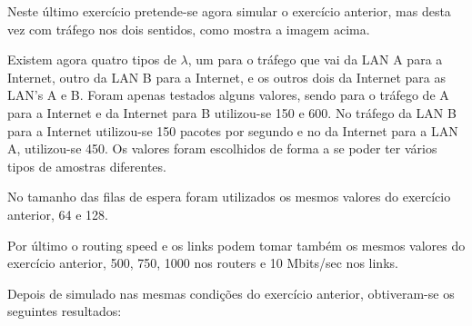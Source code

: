 \documentclass[pdftex,12pt,a4paper]{report}
\begin{document}
Neste último exercício pretende-se agora simular o exercício anterior, mas desta vez com tráfego nos dois sentidos, como mostra a imagem acima.

Existem agora quatro tipos de $\lambda$, um para o tráfego que vai da LAN A para a Internet, outro da LAN B para a Internet, e os outros dois da Internet para as LAN's A e B. Foram apenas testados alguns valores, sendo para o tráfego de A para a Internet e da Internet para B utilizou-se 150 e 600. No tráfego da LAN B para a Internet utilizou-se 150 pacotes por segundo e no da Internet para a LAN A, utilizou-se 450. Os valores foram escolhidos de forma a se poder ter vários tipos de amostras diferentes.

No tamanho das filas de espera foram utilizados os mesmos valores do exercício anterior, 64 e 128.

Por último o routing speed e os links podem tomar também os mesmos valores do exercício anterior, 500, 750, 1000 nos routers e 10 Mbits/sec nos links.

Depois de simulado nas mesmas condições do exercício anterior, obtiveram-se os seguintes resultados:
\end{document}
